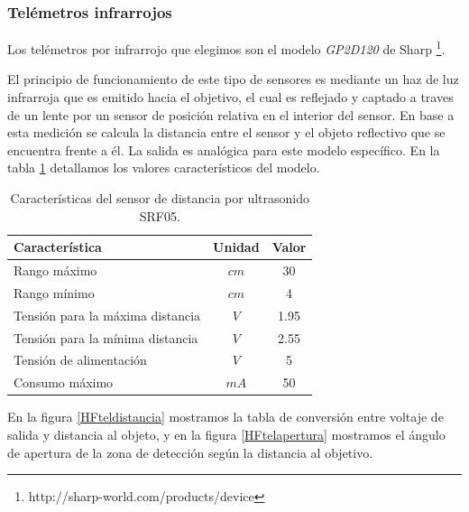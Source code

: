 \subsubsection{Tel\'emetros infrarrojos}
\label{HStelemetros}

Los tel\'emetros por infrarrojo que elegimos son el modelo \emph{GP2D120} de Sharp \footnote{http://sharp-world.com/products/device}.

El principio de funcionamiento de este tipo de sensores es mediante un haz de luz infrarroja que es emitido hacia el objetivo, el cual
es reflejado y captado a traves de un lente por un sensor de posici\'on relativa en el interior del sensor. En base a esta medici\'on
se calcula la distancia entre el sensor y el objeto reflectivo que se encuentra frente a \'el. La salida es anal\'ogica para este
modelo espec\'ifico. En la tabla \ref{HTtel} detallamos los valores caracter\'isticos del modelo.

\begin{table}
	\begin{center}
		\begin{tabular}{|l|c|c|}
			\hline
			Caracter\'istica & Unidad & Valor\\
			\hline
			Rango m\'aximo & $cm$ & 30 \\
			Rango m\'inimo & $cm$ & 4 \\
			Tensi\'on para la m\'axima distancia & $V$ & 1.95 \\
			Tensi\'on para la m\'inima distancia & $V$ & 2.55 \\
			Tensi\'on de alimentaci\'on & $V$ & 5 \\
			Consumo m\'aximo & $mA$ & 50 \\
			\hline
		\end{tabular}
	\end{center}
	\caption{Caracter\'isticas del sensor de distancia por ultrasonido SRF05.}
	\label{HTtel}
\end{table}

En la figura \ref{HFteldistancia} mostramos la tabla de conversi\'on entre voltaje de salida y distancia al objeto, y en la figura 
\ref{HFtelapertura} mostramos el \'angulo de apertura de la zona de detecci\'on seg\'un la distancia al objetivo.

